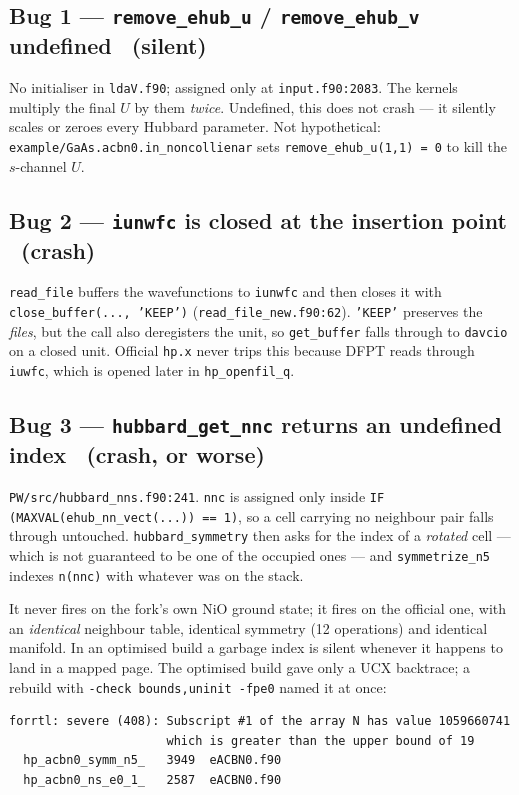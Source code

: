 \documentclass[11pt,a4paper]{article}
\newcommand{\C}[1]{\texttt{\small #1}}
\begin{document}
\subsection*{Bug 1 --- \texttt{remove_ehub_u} / \texttt{remove_ehub_v} undefined \ \textcolor{mute}{(silent)}}

No initialiser in \C{ldaV.f90}; assigned only at \C{input.f90:2083}. The kernels
multiply the final $U$ by them \emph{twice}. Undefined, this does not crash ---
it silently scales or zeroes every Hubbard parameter. Not hypothetical:
\C{example/GaAs.acbn0.in_noncollienar} sets \C{remove_ehub_u(1,1) = 0} to kill
the $s$-channel $U$.

\subsection*{Bug 2 --- \texttt{iunwfc} is closed at the insertion point \ \textcolor{rust}{(crash)}}

\C{read_file} buffers the wavefunctions to \C{iunwfc} and then closes it with
\C{close_buffer(..., 'KEEP')} (\C{read_file_new.f90:62}). \C{'KEEP'} preserves
the \emph{files}, but the call also deregisters the unit, so \C{get_buffer}
falls through to \C{davcio} on a closed unit. Official \C{hp.x} never trips this
because DFPT reads through \C{iuwfc}, which is opened later in \C{hp_openfil_q}.

\subsection*{Bug 3 --- \texttt{hubbard_get_nnc} returns an undefined index \ \textcolor{rust}{(crash, or worse)}}

\C{PW/src/hubbard_nns.f90:241}. \C{nnc} is assigned only inside
\C{IF (MAXVAL(ehub_nn_vect(...)) == 1)}, so a cell carrying no neighbour pair
falls through untouched. \C{hubbard_symmetry} then asks for the index of a
\emph{rotated} cell --- which is not guaranteed to be one of the occupied ones
--- and \C{symmetrize_n5} indexes \C{n(nnc)} with whatever was on the stack.

It never fires on the fork's own NiO ground state; it fires on the official one,
with an \emph{identical} neighbour table, identical symmetry (12 operations)
and identical manifold. In an optimised build a garbage index is silent
whenever it happens to land in a mapped page. The optimised build gave only a
UCX backtrace; a rebuild with \C{-check bounds,uninit -fpe0} named it at once:

\begin{lstlisting}
forrtl: severe (408): Subscript #1 of the array N has value 1059660741
                      which is greater than the upper bound of 19
  hp_acbn0_symm_n5_   3949  eACBN0.f90
  hp_acbn0_ns_e0_1_   2587  eACBN0.f90
\end{lstlisting}
\end{document}
